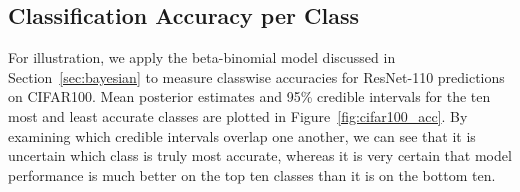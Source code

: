 \documentclass{article}
\begin{document}


\subsection{Classification Accuracy per Class}\label{sec:accuracy-experiment}

For illustration, we apply the beta-binomial model discussed in Section~\ref{sec:bayesian} to measure classwise accuracies for ResNet-110 predictions on CIFAR100.
Mean posterior estimates and 95\% credible intervals for the ten most and least accurate classes are plotted in Figure~\ref{fig:cifar100_acc}.
By examining which credible intervals overlap one another, we can see that it is uncertain which class is truly most accurate, whereas it is very certain that model performance is much better on the top ten classes than it is on the bottom ten.
\end{document}

